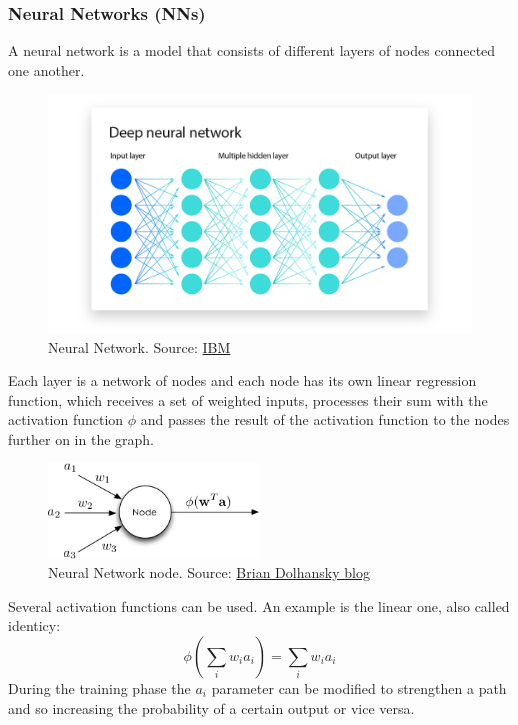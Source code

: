 \documentclass[12pt]{article}
\begin{document}
    \subsubsection{Neural Networks (NNs)}
A neural network is a model that consists of different layers of nodes connected one another.\begin{figure}[H]
\centering
        \includegraphics[width=1\textwidth]{DeepNeuralNetwork.png}
\caption[Neural Network]{Neural Network. Source: \href{https://www.ibm.com/topics/neural-networks}{IBM}}
\label{fig:nodeNN}
\end{figure}
Each layer is a network of nodes and each node has its own linear regression function, which receives a set of weighted inputs, processes their sum with the activation function $\phi$ and passes the result of the activation function to the nodes further on in the graph. 
    \begin{figure}[H]
    \centering
            \includegraphics[width=0.5\textwidth]{nodeNN.png}
    \caption[Neural Network node]{Neural Network node. Source: \href{https://www.briandolhansky.com/blog/artificial-neural-networks-linear-regression-part-1}{Brian Dolhansky blog}}
    \end{figure}
Several activation functions can be used. An example is the linear one, also called identicy:
$$ \phi \left( \sum_i w_i a_i \right) =  \sum_i w_i a_i $$
During the training phase the $a_i$ parameter can be modified to strengthen a path and so increasing the probability of a certain output or vice versa.\\
\end{document}
